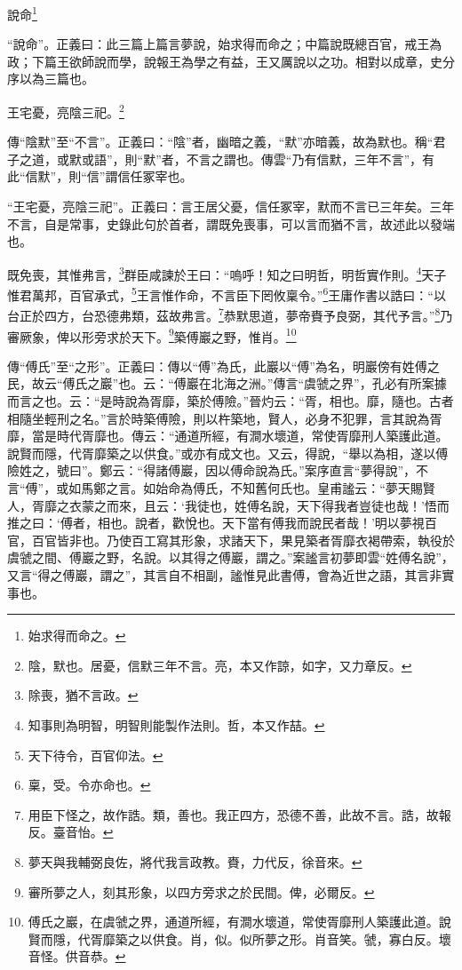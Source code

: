 說命\footnote{始求得而命之。}

{\noindent\shu{}\fzkt “說命”。正義曰：此三篇上篇言夢說，始求得而命之；中篇說既總百官，戒王為政；下篇王欲師說而學，說報王為學之有益，王又厲說以之功。相對以成章，史分序以為三篇也。 \par}

王宅憂，亮陰三祀。\footnote{陰，默也。居憂，信默三年不言。亮，本又作諒，如字，又力章反。}


{\noindent\zhuan{}\fzbyks 傳“陰默”至“不言”。正義曰：“陰”者，幽暗之義，“默”亦暗義，故為默也。稱“君子之道，或默或語”，則“默”者，不言之謂也。傳雲“乃有信默，三年不言”，有此“信默”，則“信”謂信任冢宰也。 \par}

{\noindent\shu{}\fzkt “王宅憂，亮陰三祀”。正義曰：言王居父憂，信任冢宰，默而不言已三年矣。三年不言，自是常事，史錄此句於首者，謂既免喪事，可以言而猶不言，故述此以發端也。 \par}

既免喪，其惟弗言，\footnote{除喪，猶不言政。}群臣咸諫於王曰：“嗚呼！知之曰明哲，明哲實作則。\footnote{知事則為明智，明智則能製作法則。哲，本又作喆。}天子惟君萬邦，百官承式，\footnote{天下待令，百官仰法。}王言惟作命，不言臣下罔攸稟令。”\footnote{稟，受。令亦命也。}王庸作書以誥曰：“以台正於四方，台恐德弗類，茲故弗言。\footnote{用臣下怪之，故作誥。類，善也。我正四方，恐德不善，此故不言。誥，故報反。臺音怡。}恭默思道，夢帝賚予良弼，其代予言。”\footnote{夢天與我輔弼良佐，將代我言政教。賚，力代反，徐音來。}乃審厥象，俾以形旁求於天下。\footnote{審所夢之人，刻其形象，以四方旁求之於民間。俾，必爾反。}築傅巖之野，惟肖。\footnote{傅氏之巖，在虞虢之界，通道所經，有澗水壞道，常使胥靡刑人築護此道。說賢而隱，代胥靡築之以供食。肖，似。似所夢之形。肖音笑。虢，寡白反。壞音怪。供音恭。}

{\noindent\zhuan{}\fzbyks 傳“傅氏”至“之形”。正義曰：傳以“傅”為氏，此巖以“傅”為名，明巖傍有姓傅之民，故云“傅氏之巖”也。云：“傅巖在北海之洲。”傳言“虞虢之界”，孔必有所案據而言之也。云：“是時說為胥靡，築於傅險。”晉灼云：“胥，相也。靡，隨也。古者相隨坐輕刑之名。”言於時築傅險，則以杵築地，賢人，必身不犯罪，言其說為胥靡，當是時代胥靡也。傳云：“通道所經，有澗水壞道，常使胥靡刑人築護此道。說賢而隱，代胥靡築之以供食。”或亦有成文也。又云，得說，“舉以為相，遂以傅險姓之，號曰”。鄭云：“得諸傅巖，因以傅命說為氏。”案序直言“夢得說”，不言“傅”，或如馬鄭之言。如始命為傅氏，不知舊何氏也。皇甫謐云：“夢天賜賢人，胥靡之衣蒙之而來，且云：‘我徒也，姓傅名說，天下得我者豈徒也哉！’悟而推之曰：‘傅者，相也。說者，歡悅也。天下當有傅我而說民者哉！’明以夢視百官，百官皆非也。乃使百工寫其形象，求諸天下，果見築者胥靡衣褐帶索，執役於虞虢之間、傅巖之野，名說。以其得之傅巖，謂之。”案謐言初夢即雲“姓傅名說”，又言“得之傅巖，謂之”，其言自不相副，謐惟見此書傅，會為近世之語，其言非實事也。 \par}

